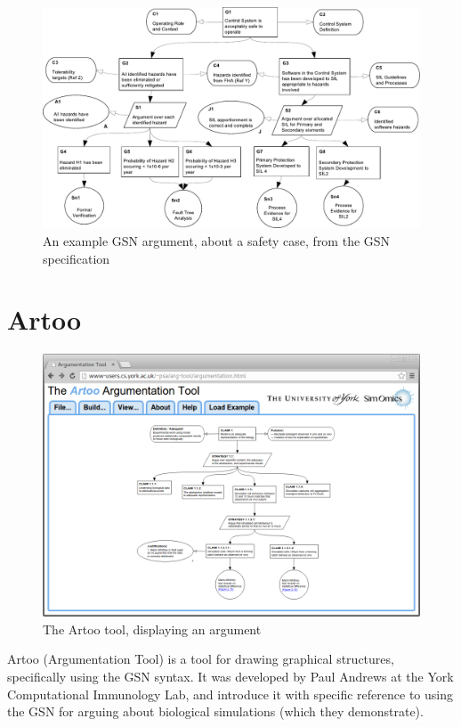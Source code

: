\begin{figure}
  \centering
  \includegraphics[width=\textwidth]{graphics/example_argument.pdf}
  \caption{An example GSN argument, about a safety case,
    from the GSN specification \cite{gsnstandard}}
  \label{fig:crampedex1}
\end{figure}




\section{Artoo}

\begin{figure}
  \centering
  \includegraphics[width=\textwidth]{graphics/artoo_screenshot.png}
  \caption{The Artoo tool, displaying an argument}
  \label{fig:artoo}
\end{figure}

Artoo (Argumentation Tool) is a tool for drawing graphical structures, specifically using the GSN syntax.
It was developed by Paul Andrews at the York Computational Immunology Lab, and \citet{royal} introduce it with specific reference to using the GSN for arguing about biological simulations (which they demonstrate).

